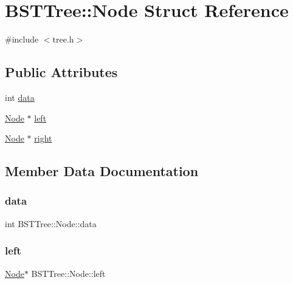 \hypertarget{struct_b_s_t_tree_1_1_node}{}\section{B\+S\+T\+Tree\+:\+:Node Struct Reference}
\label{struct_b_s_t_tree_1_1_node}


{\ttfamily \#include $<$tree.\+h$>$}

\subsection*{Public Attributes}
\begin{DoxyCompactItemize}
\item 
int \mbox{\hyperlink{struct_b_s_t_tree_1_1_node_ae18550c6db3b439aa3590d1a8bdf8ee1}{data}}
\item 
\mbox{\hyperlink{struct_b_s_t_tree_1_1_node}{Node}} $\ast$ \mbox{\hyperlink{struct_b_s_t_tree_1_1_node_af485afd7e508566cfd64442ef0c034e0}{left}}
\item 
\mbox{\hyperlink{struct_b_s_t_tree_1_1_node}{Node}} $\ast$ \mbox{\hyperlink{struct_b_s_t_tree_1_1_node_a51a49dec2ada0ba140f9df5aa48119a8}{right}}
\end{DoxyCompactItemize}


\subsection{Member Data Documentation}
\mbox{\label{struct_b_s_t_tree_1_1_node_ae18550c6db3b439aa3590d1a8bdf8ee1}} 
\subsubsection{\texorpdfstring{data}{data}}
{\footnotesize\ttfamily int B\+S\+T\+Tree\+::\+Node\+::data}

\mbox{\label{struct_b_s_t_tree_1_1_node_af485afd7e508566cfd64442ef0c034e0}} 
\subsubsection{\texorpdfstring{left}{left}}
{\footnotesize\ttfamily \mbox{\hyperlink{struct_b_s_t_tree_1_1_node}{Node}}$\ast$ B\+S\+T\+Tree\+::\+Node\+::left}

